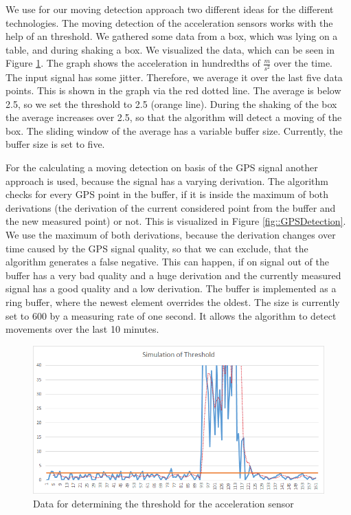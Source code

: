 We use for our moving detection approach two different ideas for the different technologies. The moving detection of the acceleration sensors works with the help of an threshold. We gathered some data from a box, which was lying on a table, and during shaking a box. We visualized the data, which can be seen in Figure \ref{fig::AccelDetection}. The graph shows the acceleration in hundredths of $\frac{m}{s^{2}}$ over the time. The input signal has some jitter. Therefore, we average it over the last five data points. This is shown in the graph via the red dotted line. The average is below 2.5, so we set the threshold to 2.5 (orange line). During the shaking of the box the average increases over 2.5, so that the algorithm will detect a moving of the box. The sliding window of the average has a variable buffer size. Currently, the buffer size is set to five.

For the calculating a moving detection on basis of the GPS signal another approach is used, because the signal has a varying derivation. The algorithm checks for every GPS point in the buffer, if it is inside the maximum of both derivations (the derivation of the current considered point from the buffer and the new measured point) or not. This is visualized in Figure \ref{fig::GPSDetection}. We use the maximum of both derivations, because the derivation changes over time caused by the GPS signal quality, so that we can exclude, that the algorithm generates a false negative. This can happen, if on signal out of the buffer has a very bad quality and a huge derivation and the currently measured signal has a good quality and a low derivation. The buffer is implemented as a ring buffer, where the newest element overrides the oldest. The size is currently set to 600 by a measuring rate of one second. It allows the algorithm to detect movements over the last 10 minutes.

\begin{figure} [h]
    \includegraphics[clip, trim=0.1cm 0.1cm 0.1cm 0.1cm, width=1\textwidth]{src/pic/threshold}
    \caption{Data for determining the threshold for the acceleration sensor}
    \label{fig::AccelDetection}
\end{figure}

